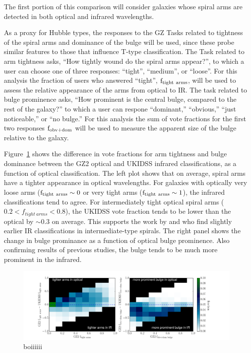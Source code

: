 The first portion of this comparison will consider galaxies whose spiral arms are detected in both optical and infrared wavelengths. 

As a proxy for Hubble types, the responses to the GZ Tasks related to tightness of the spiral arms and dominance of the bulge will be used, since these probe similar features to those that influence T-type classification. The Task related to arm tightness asks, ``How tightly wound do the spiral arms appear?'', to which a user can choose one of three responses: ``tight'', ``medium'', or ``loose''. For this analysis the fraction of users who answered ``tight'', $\rm f_{tight~arms}$, will be used to assess the relative appearance of the arms from optical to IR. The task related to bulge prominence asks, ``How prominent is the central bulge, compared to the rest of the galaxy?'' to which a user can respone ``dominant,'' ``obvious,'' ``just noticeable,'' or ``no bulge.'' For this analysis the sum of vote fractions for the first two responses $\rm f_{obv+dom} $ will be used to measure the apparent size of the bulge relative to the galaxy.   

Figure~\ref{fig:ttype} shows the difference in vote fractions for arm tightness and bulge dominance between the GZ2 optical and UKIDSS infrared classifications, as a function of optical classification. The left plot shows that on average, spiral arms have a tighter appearance in optical wavelengths. For galaxies with optically very loose arms ($\rm f_{tight~arms} \sim 0$ or very tight arms ($\rm f_{tight~arms} \sim 1$), the infrared classifications tend to agree. For intermediately tight optical spiral arms ($0.2 < f_{tight~arms} < 0.8$), the UKIDSS vote fraction tends to be lower than the optical by $\sim 0.3$ on average. This supports the work by \citet{Eskridge2002} and \citet{Buta2010} who find slightly earlier IR classifications in intermediate-type spirals. The right panel shows the change in bulge prominance as a function of optical bulge prominence. Also confirming results of previous studies, the bulge tends to be much more prominent in the infrared. 

\begin{figure}
\centering
\includegraphics[width=1\textwidth]{figures/t_type.pdf}
\caption{boiiiiii}
\label{fig:ttype}
\end{figure}

